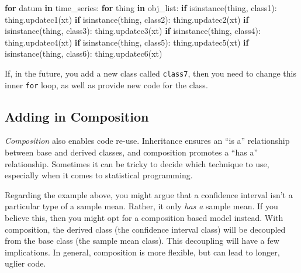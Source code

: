 \documentclass[
  12pt,
  krantz2]{krantz}
\makeatletter
\newenvironment{Shaded}{\begin{snugshade}}{\end{snugshade}}
\newcommand{\BuiltInTok}[1]{#1}
\newcommand{\ControlFlowTok}[1]{\textcolor[rgb]{0.27,0.27,0.27}{\textbf{#1}}}
\newcommand{\KeywordTok}[1]{\textcolor[rgb]{0.27,0.27,0.27}{\textbf{#1}}}
\newcommand{\NormalTok}[1]{#1}
\newenvironment{kframe}{%
\medskip{}
\setlength{\fboxsep}{.8em}
 \def\at@end@of@kframe{}%
 \ifinner\ifhmode%
  \def\at@end@of@kframe{\end{minipage}}%
  \begin{minipage}{\columnwidth}%
 \fi\fi%
 \def\FrameCommand##1{\hskip\@totalleftmargin \hskip-\fboxsep
 \colorbox{shadecolor}{##1}\hskip-\fboxsep
     \hskip-\linewidth \hskip-\@totalleftmargin \hskip\columnwidth}%
 \MakeFramed {\advance\hsize-\width
   \@totalleftmargin\z@ \linewidth\hsize
   \@setminipage}}%
 {\par\unskip\endMakeFramed%
 \at@end@of@kframe}
\renewenvironment{Shaded}{\begin{kframe}}{\end{kframe}}
\makeatother
\begin{document}
\begin{Shaded}
\begin{Highlighting}[]
\ControlFlowTok{for}\NormalTok{ datum }\KeywordTok{in}\NormalTok{ time\_series:}
  \ControlFlowTok{for}\NormalTok{ thing }\KeywordTok{in}\NormalTok{ obj\_list:}
    \ControlFlowTok{if} \BuiltInTok{isinstance}\NormalTok{(thing, class1):}
\NormalTok{      thing.updatec1(xt)}
    \ControlFlowTok{if} \BuiltInTok{isinstance}\NormalTok{(thing, class2):}
\NormalTok{      thing.updatec2(xt)}
    \ControlFlowTok{if} \BuiltInTok{isinstance}\NormalTok{(thing, class3):}
\NormalTok{      thing.updatec3(xt)}
    \ControlFlowTok{if} \BuiltInTok{isinstance}\NormalTok{(thing, class4):}
\NormalTok{      thing.updatec4(xt)}
    \ControlFlowTok{if} \BuiltInTok{isinstance}\NormalTok{(thing, class5):}
\NormalTok{      thing.updatec5(xt)}
    \ControlFlowTok{if} \BuiltInTok{isinstance}\NormalTok{(thing, class6):}
\NormalTok{      thing.updatec6(xt)}
\end{Highlighting}
\end{Shaded}

If, in the future, you add a new class called \texttt{class7}, then you need to change this inner \texttt{for} loop, as well as provide new code for the class.

\hypertarget{adding-in-composition}{%
\subsection{Adding in Composition}\label{adding-in-composition}}

\emph{Composition} also enables code re-use. Inheritance ensures an ``is a'' relationship between base and derived classes, and composition promotes a ``has a'' relationship. Sometimes it can be tricky to decide which technique to use, especially when it comes to statistical programming.

Regarding the example above, you might argue that a confidence interval isn't a particular type of a sample mean. Rather, it only \emph{has a} sample mean. If you believe this, then you might opt for a composition based model instead. With composition, the derived class (the confidence interval class) will be decoupled from the base class (the sample mean class). This decoupling will have a few implications. In general, composition is more flexible, but can lead to longer, uglier code.
\end{document}
